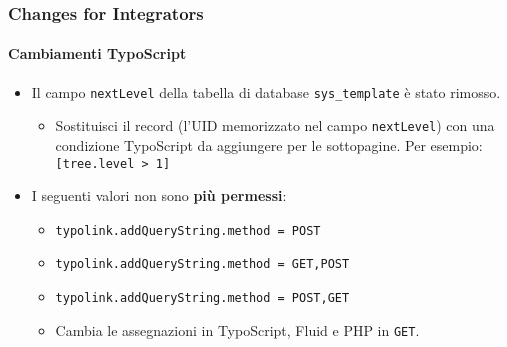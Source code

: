 
\begin{frame}[fragile]
	\frametitle{Changes for Integrators}
	\framesubtitle{Cambiamenti TypoScript}

	\begin{itemize}
		\item Il campo \texttt{nextLevel} della tabella di database
			\texttt{sys\_template} è stato rimosso.

			\begin{itemize}\smaller
				\item[\ding{228}] Sostituisci il record (l'UID memorizzato nel campo \texttt{nextLevel}) con una condizione TypoScript da aggiungere per le sottopagine. Per esempio: \texttt{[tree.level > 1]}
			\end{itemize}\normalsize

		\item I seguenti valori non sono \textbf{più permessi}:

			\begin{itemize}\smaller
				\item \texttt{typolink.addQueryString.method = POST}
				\item \texttt{typolink.addQueryString.method = GET,POST}
				\item \texttt{typolink.addQueryString.method = POST,GET}
			\end{itemize}\normalsize

			\begin{itemize}\smaller
				\item[\ding{228}] Cambia le assegnazioni in TypoScript, Fluid e PHP in \texttt{GET}.
			\end{itemize}\normalsize

	\end{itemize}

\end{frame}


